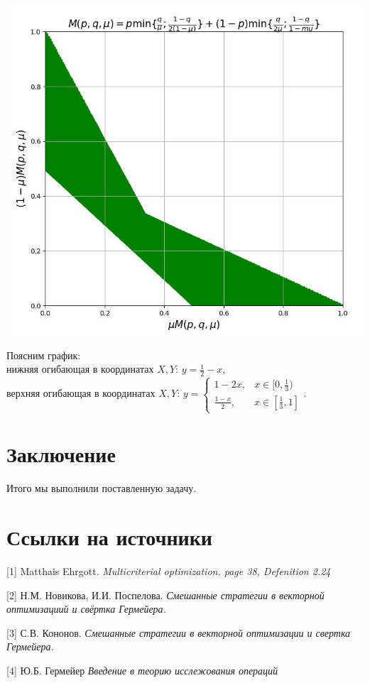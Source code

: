 \documentclass[letterpaper,12pt, reqno]{article}
\begin{document}
\begin{flushleft}
\begin{center}
\includegraphics[scale=0.6]{graf_4}
\end{center}

Поясним график: \\
нижняя огибающая в координатах $X,Y$: $y=\frac{1}{2}-x$, \\
верхняя огибающая в координатах $X,Y$: $y=
\begin{cases}
1-2x, & x \in [0, \frac{1}{3}) \\
\frac{1-x}{2}, & x \in [\frac{1}{3}, 1]
\end{cases}.
$

\section{Заключение}
Итого мы выполнили поставленную задачу.

\section{Ссылки на источники}
[1] Matthais Ehrgott. \textit{Multicriterial optimization. page 38, Defenition 2.24}

[2] Н.М. Новикова, И.И. Поспелова. \textit{Смешанные стратегии в векторной оптимизациий и свёртка Гермейера.}

[3] С.В. Кононов. \textit{Смешанные стратегии в векторной оптимизации и свертка Гермейера.}

[4] Ю.Б. Гермейер \textit{Введение в теорию исслежования операций}


\end{flushleft}
\end{document}
